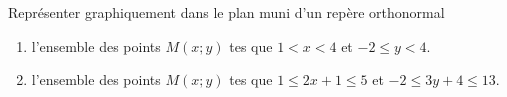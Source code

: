 
Représenter graphiquement dans le plan muni d'un repère orthonormal 
 
\begin{enumerate}
\item l'ensemble des points $M(x;y)$ tes que  $1 < x < 4$ et $-2 \leq y <4$.
\item l'ensemble des points $M(x;y)$ tes que  $1 \leq  2x+1 \leq  5$ et $-2 \leq 3y + 4  \leq  13$.
\end{enumerate}